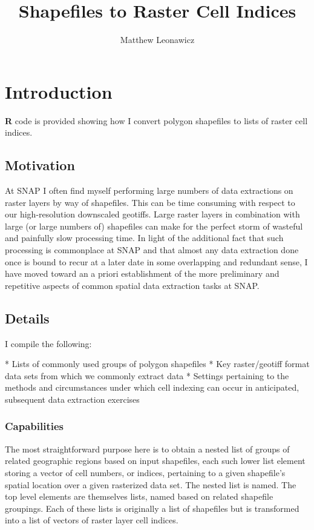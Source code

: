 \documentclass{article}\usepackage[]{graphicx}\usepackage[]{color}
\begin{document}
\title{Shapefiles to Raster Cell Indices}
\author{Matthew Leonawicz}
\maketitle






\section{Introduction}
\textbf{R} code is provided showing how I convert polygon shapefiles to lists of raster cell indices.

\subsection{Motivation}
At SNAP I often find myself performing large numbers of data extractions on raster layers by way of shapefiles.
This can be time consuming with respect to our high-resolution downscaled geotiffs.
Large raster layers in combination with large (or large numbers of) shapefiles can make for the perfect storm of wasteful and painfully slow processing time.
In light of the additional fact that such processing is commonplace at SNAP and that almost any data extraction done once is bound to recur at a later date in some overlapping and redundant sense,
I have moved toward an a priori establishment of the more preliminary and repetitive aspects of common spatial data extraction tasks at SNAP.

\subsection{Details}
I compile the following:

* Lists of commonly used groups of polygon shapefiles
* Key raster/geotiff format data sets from which we commonly extract data
* Settings pertaining to the methods and circumstances under which cell indexing can occur in anticipated, subsequent data extraction exercises

\subsubsection{Capabilities}
The most straightforward purpose here is to obtain a nested list of groups of related geographic regions based on input shapefiles,
each such lower list element storing a vector of cell numbers, or indices, pertaining to a given shapefile's spatial location over a given rasterized data set.
The nested list is named. The top level elements are themselves lists, named based on related shapefile groupings.
Each of these lists is originally a list of shapefiles but is transformed into a list of vectors of raster layer cell indices.
\end{document}
